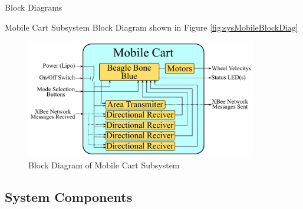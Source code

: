 \documentclass{beamer}
\begin{document}
\begin{frame}{Block Diagrams}
  \begin{block}{}
    Mobile Cart Subsystem Block Diagram shown in Figure \autoref{fig:sysMobileBlockDiag}
  \end{block}
  \begin{figure}[b]
    \centering
    \includegraphics[width=0.9\textwidth]{figs/mobile_cart_block_diagram}
    \caption{Block Diagram of Mobile Cart Subsystem}
    \label{fig:sysMobileBlockDiag}
  \end{figure}
\end{frame}


\subsection{System Components}
\end{document}
